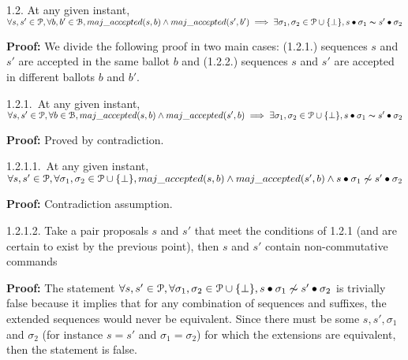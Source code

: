 \indent\indent\indent\parbox{\linewidth-\algorithmicindent*3}{\strut1.2. At any given instant, $\forall s,s' \in \mathcal{P},\forall b,b' \in \mathcal{B}, maj\_accepted(s,b) \land maj\_accepted(s',b') \implies \exists \sigma_1,\sigma_2 \in \mathcal{P} \cup \{\bot\}, s \bullet \sigma_1 \thicksim s' \bullet \sigma_2$}\par
\indent\indent\indent\indent\parbox{\linewidth-\algorithmicindent*4}{\strut\textbf{Proof:} We divide the following proof in two main cases: (1.2.1.) sequences $s$ and $s'$ are accepted in the same ballot $b$ and (1.2.2.) sequences $s$ and $s'$ are accepted in different ballots $b$ and $b'$.}\par
\indent\indent\indent\indent\indent\parbox{\linewidth-\algorithmicindent*5}{\strut1.2.1.~At any given instant, $\forall s,s' \in \mathcal{P},\forall b \in \mathcal{B}, maj\_accepted(s,b) \land maj\_accepted(s',b) \implies \exists \sigma_1,\sigma_2 \in \mathcal{P} \cup \{\bot\}, s \bullet \sigma_1 \thicksim s' \bullet \sigma_2$} \par
\indent\indent\indent\indent\indent\indent\parbox{\linewidth}{\strut\textbf{Proof:} Proved by contradiction.}\par
\indent\indent\indent\indent\indent\indent\indent\parbox{\linewidth-\algorithmicindent*5}{\strut1.2.1.1.~At any given instant, $\forall s,s' \in \mathcal{P}, \forall \sigma_1,\sigma_2 \in \mathcal{P} \cup \{\bot \}, maj\_accepted(s,b) \land maj\_accepted(s',b) \wedge s \bullet \sigma_1 \not\thicksim s' \bullet \sigma_2$} \par
\indent\indent\indent\indent\indent\indent\indent\indent\parbox{\linewidth}{\strut\textbf{Proof:} Contradiction assumption.}\par
\indent\indent\indent\indent\indent\indent\indent\parbox{\linewidth-\algorithmicindent*5}{\strut1.2.1.2. Take a pair proposals $s$ and $s'$ that meet the conditions of 1.2.1 (and are certain to exist by the previous point), then $s$ and $s'$ contain non-commutative commands}\par
\indent\indent\indent\indent\indent\indent\indent\indent\parbox{\linewidth-\algorithmicindent*6}{\strut\textbf{Proof:} The statement $\forall s,s' \in \mathcal{P}, \forall \sigma_1,\sigma_2 \in \mathcal{P} \cup \{\bot \}, s \bullet \sigma_1 \not\thicksim s' \bullet \sigma_2$ is trivially false because it implies that for any combination of sequences and suffixes, the extended sequences would never be equivalent. Since there must be some $s,s',\sigma_1$ and $\sigma_2$ (for instance $s=s'$ and $\sigma_1=\sigma_2$) for which the extensions are equivalent, then the statement is false.}\par

